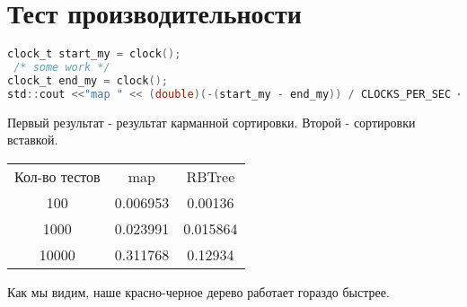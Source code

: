 \section{Тест производительности}
\begin{lstlisting}[language=C]
clock_t start_my = clock();
 /* some work */
clock_t end_my = clock();
std::cout <<"map " << (double)(-(start_my - end_my)) / CLOCKS_PER_SEC << std::endl;
\end{lstlisting}
Первый результат - результат карманной сортировки. Второй - сортировки вставкой.

\begin{center}
\begin{table}[h]

\label{tabular:timesandtenses}

\begin{tabular}{c|c|c}
Кол-во тестов & map & RBTree\\

100 & 0.006953 & 0.00136\\
1000 & 0.023991 & 0.015864\\
10000 & 0.311768 & 0.12934\\
\end{tabular}
\end{table}
\end{center}
Как мы видим, наше красно-черное дерево работает гораздо быстрее.


 
\pagebreak
